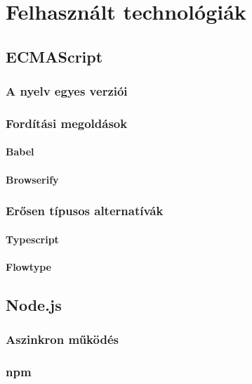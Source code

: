 \chapter{Felhasznált technológiák}

\section{ECMAScript}

\subsection{A nyelv egyes verziói}

\subsection{Fordítási megoldások}

\subsubsection{Babel}

\subsubsection{Browserify}

\subsection{Erősen típusos alternatívák}

\subsubsection{Typescript}

\subsubsection{Flowtype}

\section{Node.js}

\subsection{Aszinkron működés}

\subsection{npm}

